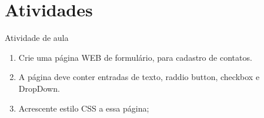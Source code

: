 \documentclass{beamer}
\begin{document}
\section{Atividades}
\begin{frame}{Atividade de aula}
\begin{enumerate}
 \item Crie uma página WEB de formulário, para cadastro de contatos.
 \item A página deve conter entradas de texto, raddio button, checkbox e DropDown.
  \item Acrescente estilo CSS a essa página;
\end{enumerate}
\end{frame}
\end{document}
